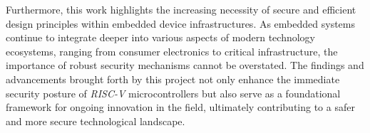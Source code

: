 Furthermore, this work highlights the increasing necessity of secure and efficient
design principles within embedded device infrastructures. As embedded systems
continue to integrate deeper into various aspects of modern technology
ecosystems, ranging from consumer electronics to critical infrastructure, the
importance of robust security mechanisms cannot be overstated. The findings and advancements
brought forth by this project not only enhance the immediate security posture of
\textit{RISC-V} microcontrollers but also serve as a foundational framework for
ongoing innovation in the field, ultimately contributing to a safer and more secure
technological landscape.
